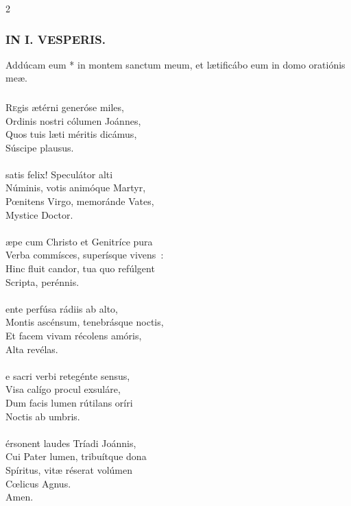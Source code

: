 \documentclass[9pt,twoside]{extarticle}
\begin{document}
\begin{multicols}{2}
{{\subsubsection*{\center \textsc{IN I. VESPERIS.}}
\begin{tightlist}{}
\item {} Addúcam eum * in montem sanctum meum, et lætificábo eum in domo oratiónis meæ.
\item {}
\end{tightlist}

\subsubsection*{\center {}}
\lettrine{R}egis ætérni generóse miles,\\
Ordinis nostri cólumen Joánnes,\\
Quos tuis læti méritis dicámus,\\
Súscipe plausus.\\
\\
 satis felix! Speculátor alti\\
Núminis, votis animóque Martyr,\\
Pœnitens Virgo, memoránde Vates,\\
Mystice Doctor.\\
\\
æpe cum Christo et Genitríce pura\\
Verba commísces, superísque vivens~:\\
Hinc fluit candor, tua quo refúlgent\\
Scripta, perénnis.\\
\\
ente perfúsa rádiis ab alto,\\
Montis ascénsum, tenebrásque noctis,\\
Et facem vivam récolens amóris,\\
Alta revélas.\\
\\
e sacri verbi retegénte sensus,\\
Visa calígo procul exsuláre,\\
Dum facis lumen rútilans oríri\\
Noctis ab umbris.\\
\\
érsonent laudes Tríadi Joánnis,\\
Cui Pater lumen, tribuítque dona\\
Spíritus, vitæ réserat volúmen\\
Cœlicus Agnus.\\
Amen.

}}
\end{multicols}
\end{document}

